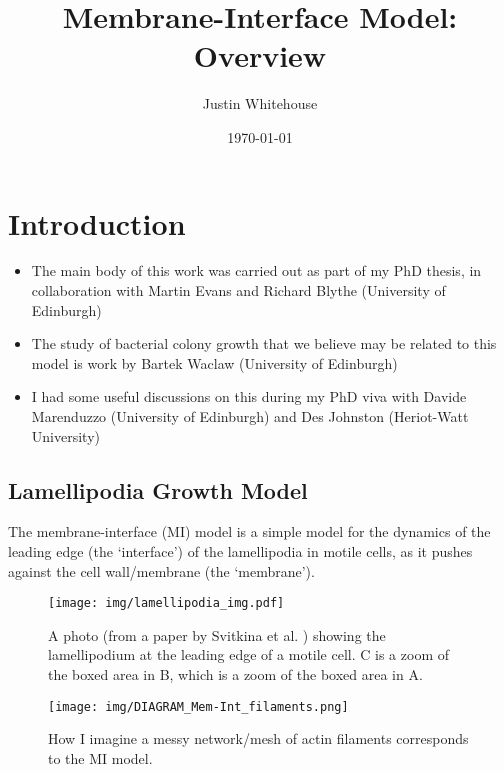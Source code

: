 \documentclass[a4paper,10pt]{article}
\title{Membrane-Interface Model: Overview}
\author{Justin Whitehouse}
\date{\today}
\begin{document}
\maketitle

\tableofcontents
\newpage

\section{Introduction}

\begin{itemize}
 \item The main body of this work was carried out as part of my PhD thesis, in collaboration with Martin Evans and Richard Blythe (University of Edinburgh)
 \item The study of bacterial colony growth that we believe may be related to this model is work by Bartek Waclaw (University of Edinburgh)
 \item I had some useful discussions on this during my PhD viva with Davide Marenduzzo (University of Edinburgh) and Des Johnston (Heriot-Watt University)
\end{itemize}

\subsection{Lamellipodia Growth Model}


The membrane-interface (MI) model is a simple model for the dynamics of the leading edge (the `interface') of the lamellipodia in motile cells, as it pushes against the cell wall/membrane (the `membrane').

\begin{figure}[h!]
 \centering
 \texttt{[image: img/lamellipodia\_img.pdf]}
 \caption{A photo (from a paper by Svitkina et al. \cite{Svitkina1999}) showing the lamellipodium at the leading edge of a motile cell. C is a zoom of the boxed area in B, which is a zoom of the boxed area in A.}
\end{figure}

\begin{figure}[h!]
 \centering
 \texttt{[image: img/DIAGRAM\_Mem-Int\_filaments.png]}
 \caption{How I imagine a messy network/mesh of actin filaments corresponds to the MI model.}
\end{figure}
\end{document}
